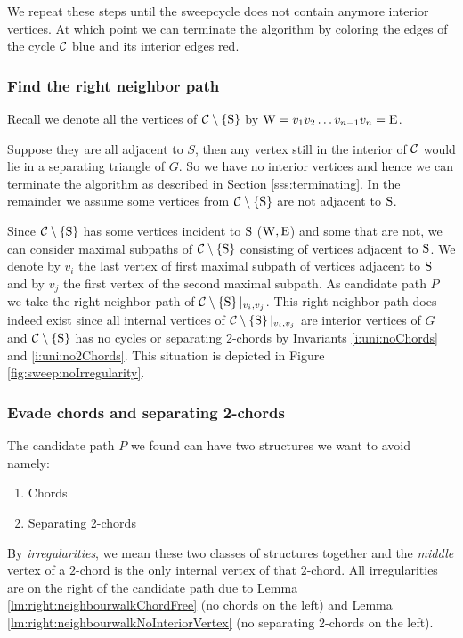 We repeat these steps until the sweepcycle does not contain anymore interior vertices. At which point we can terminate the algorithm by coloring the edges of the cycle $\mathcal{C}$ blue and its interior edges red.

\subsubsection{Find the right neighbor path}
  Recall we denote all the vertices of $\mathcal{C} \setminus \left\lbrace {\mathrm{S}} \right\rbrace$ by $\mathrm{W} =  v_1   v_2   \ldots v_{n-1}   v_n = \mathrm{E}$.

  Suppose they are all adjacent to $S$, then any vertex still in the interior of $\mathcal{C}$ would lie in a separating triangle of $G$. So we have no interior vertices and hence we can terminate the algorithm as described in Section \ref{sss:terminating}.
  In the remainder we assume some vertices from $\mathcal{C} \setminus \left\lbrace {\mathrm{S}} \right\rbrace$ are not adjacent to $\mathrm{S}$.

  Since $\mathcal{C} \setminus \left\lbrace {\mathrm{S}} \right\rbrace$ has some vertices incident to $\mathrm{S}$ ($\mathrm{W} , \mathrm{E}$) and some that are not, we can consider maximal subpaths of $\mathcal{C} \setminus \left\lbrace {\mathrm{S}} \right\rbrace$ consisting of vertices adjacent to $\mathrm{S}$.
  We denote by $v_i$ the last vertex of first maximal subpath of vertices adjacent to $\mathrm{S}$ and by $v_j$ the first vertex of the second maximal subpath.
  As candidate path $P$ we take the right neighbor path of $\mathcal{C} \setminus \left\lbrace {\mathrm{S}} \right\rbrace|_{v_i, v_j}$. This right neighbor path does indeed exist since all internal vertices of $\mathcal{C} \setminus \left\lbrace {\mathrm{S}} \right\rbrace|_{v_i, v_j}$ are interior vertices of $G$ and $\mathcal{C} \setminus \left\lbrace {\mathrm{S}} \right\rbrace$ has no cycles or separating 2-chords by Invariants \ref{i:uni:noChords} and \ref{i:uni:no2Chords}.
  This situation is depicted in Figure \ref{fig:sweep:noIrregularity}.

\subsubsection{Evade chords and separating 2-chords}
  The candidate path $P$ we found can have two structures we want to avoid namely:
  \begin{enumerate}
    \itemsep=-4pt
    \item Chords
    \item Separating 2-chords
  \end{enumerate}

  By \emph{irregularities}, we mean these two classes of structures together and the \emph{middle} vertex of a $2$-chord is the only internal vertex of that $2$-chord.
  All irregularities are on the right of the candidate path due to Lemma \ref{lm:right:neighbourwalkChordFree} (no chords on the left) and Lemma \ref{lm:right:neighbourwalkNoInteriorVertex} (no separating 2-chords on the left).


